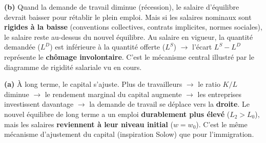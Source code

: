 
\begin{reponse}
\textbf{(b)} Quand la demande de travail diminue (récession), le salaire d'équilibre devrait baisser pour rétablir le plein emploi. Mais si les salaires nominaux sont \textbf{rigides à la baisse} (conventions collectives, contrats implicites, normes sociales), le salaire reste au-dessus du nouvel équilibre. Au salaire en vigueur, la quantité demandée ($L^D$) est inférieure à la quantité offerte ($L^S$) $\to$ l'écart $L^S - L^D$ représente le \textbf{chômage involontaire}. C'est le mécanisme central illustré par le diagramme de rigidité salariale vu en cours.
\end{reponse}


\begin{reponse}
\textbf{(a)} À long terme, le capital s'ajuste. Plus de travailleurs $\to$ le ratio $K/L$ diminue $\to$ le rendement marginal du capital augmente $\to$ les entreprises investissent davantage $\to$ la demande de travail se déplace vers la \textbf{droite}. Le nouvel équilibre de long terme a un emploi \textbf{durablement plus élevé} ($L_2 > L_0$), mais les salaires \textbf{reviennent à leur niveau initial} ($w = w_0$). C'est le même mécanisme d'ajustement du capital (inspiration Solow) que pour l'immigration.
\end{reponse}

